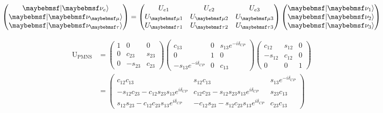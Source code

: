 \begin{gather} %
    \begin{pmatrix}
        \ket{\nu_{e}}   \\
        \ket{\nu_{\mu}} \\
        \ket{\nu_{\tau}}
    \end{pmatrix}
    =
    \begin{pmatrix}
        U_{e1}     & U_{e2}     & U_{e3}     \\
        U_{\mu 1}  & U_{\mu 2}  & U_{\mu 3}  \\
        U_{\tau 1} & U_{\tau 2} & U_{\tau 3}
    \end{pmatrix}
    \begin{pmatrix}
        \ket{\nu_{1}} \\
        \ket{\nu_{2}} \\
        \ket{\nu_{3}}
    \end{pmatrix}
\end{gather} %

\begin{align} %
    \mathrm{U}_{\mathrm{PMNS}} & =
    \begin{pmatrix}
        1 & 0       & 0      \\
        0 & c_{23}  & s_{23} \\
        0 & -s_{23} & c_{23}
    \end{pmatrix}
    \begin{pmatrix}
        c_{13}                   & 0 & s_{13}e^{-i\delta_{CP}} \\
        0                        & 1 & 0                       \\
        -s_{13}e^{-i\delta_{CP}} & 0 & c_{13}
    \end{pmatrix}
    \begin{pmatrix}
        c_{12}  & s_{12} & 0 \\
        -s_{12} & c_{12} & 0 \\
        0       & 0      & 1
    \end{pmatrix}
    \\
                               & =
    \begin{pmatrix}
        c_{12}c_{13}
         & s_{12}c_{13}
         & s_{13}e^{-i\delta_{CP}}                          \\
        -s_{12}c_{23}-c_{12}s_{23}s_{13}e^{i\delta_{CP}}
         & c_{12}c_{23}-s_{12}s_{23}s_{13}e^{i\delta_{CP}}
         & s_{23}c_{13}                                     \\
        s_{12}s_{23}-c_{12}c_{23}s_{13}e^{i\delta_{CP}}
         & -c_{12}s_{23}-s_{12}c_{23}s_{13}e^{i\delta_{CP}}
         & c_{23}c_{13}
    \end{pmatrix}
\end{align} %


